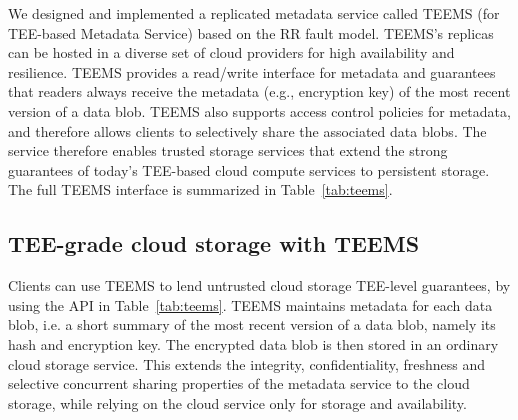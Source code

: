 
We designed and implemented a replicated metadata service called
\ac{TEEMS} (for \ac{TEE}-based Metadata Service) based on the \ac{RR} fault
model.
\ac{TEEMS}'s replicas can be hosted in a diverse set of cloud providers for
high availability and resilience.
%
\ac{TEEMS} provides a read/write interface for metadata and guarantees that
readers always receive the metadata (e.g., encryption key) of the most
recent version of a data blob.  \ac{TEEMS} also supports access control
policies for metadata, and therefore allows clients to selectively
share the associated data blobs.  The service therefore enables
trusted storage services that extend the strong guarantees of today's
\ac{TEE}-based cloud compute services to persistent storage. The full
\ac{TEEMS} interface is summarized in Table~\ref{tab:teems}.


\subsection{\ac{TEE}-grade cloud storage with \ac{TEEMS}}

Clients can use \ac{TEEMS} to lend untrusted cloud storage \ac{TEE}-level
guarantees, by using the API in Table~\ref{tab:teems}.
\ac{TEEMS} maintains metadata for each data blob, i.e. a short summary of
the most recent version of a data blob, namely its hash and encryption
key. The encrypted data blob is then stored in an ordinary cloud
storage service. This extends the integrity, confidentiality,
freshness and selective concurrent sharing properties of the
metadata service to the cloud storage, while relying on the cloud
service only for storage and availability.

